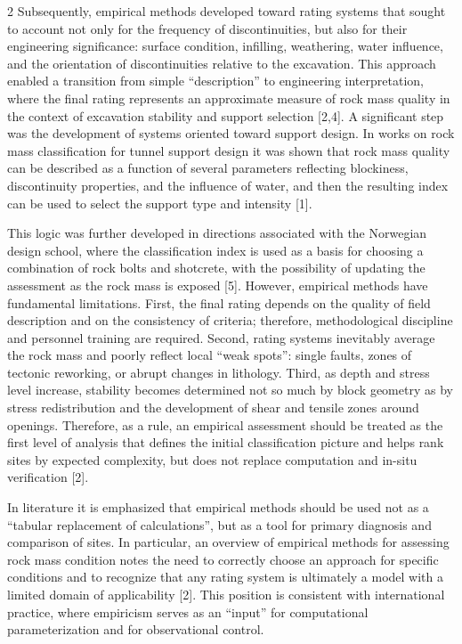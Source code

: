 \begin{multicols}{2}
Subsequently, empirical methods developed toward rating systems that
sought to account not only for the frequency of discontinuities, but
also for their engineering significance: surface condition, infilling,
weathering, water influence, and the orientation of discontinuities
relative to the excavation. This approach enabled a transition from
simple ``description'' to engineering interpretation, where the final
rating represents an approximate measure of rock mass quality in the
context of excavation stability and support selection {[}2,4{]}. A
significant step was the development of systems oriented toward support
design. In works on rock mass classification for tunnel support design
it was shown that rock mass quality can be described as a function of
several parameters reflecting blockiness, discontinuity properties, and
the influence of water, and then the resulting index can be used to
select the support type and intensity {[}1{]}.

This logic was further developed in directions associated with the
Norwegian design school, where the classification index is used as a
basis for choosing a combination of rock bolts and shotcrete, with the
possibility of updating the assessment as the rock mass is exposed
{[}5{]}. However, empirical methods have fundamental limitations. First,
the final rating depends on the quality of field description and on the
consistency of criteria; therefore, methodological discipline and
personnel training are required. Second, rating systems inevitably
average the rock mass and poorly reflect local ``weak spots'': single
faults, zones of tectonic reworking, or abrupt changes in lithology.
Third, as depth and stress level increase, stability becomes determined
not so much by block geometry as by stress redistribution and the
development of shear and tensile zones around openings. Therefore, as a
rule, an empirical assessment should be treated as the first level of
analysis that defines the initial classification picture and helps rank
sites by expected complexity, but does not replace computation and
in-situ verification {[}2{]}.

In literature it is emphasized that empirical methods should be used not
as a ``tabular replacement of calculations'', but as a tool for primary
diagnosis and comparison of sites. In particular, an overview of
empirical methods for assessing rock mass condition notes the need to
correctly choose an approach for specific conditions and to recognize
that any rating system is ultimately a model with a limited domain of
applicability {[}2{]}. This position is consistent with international
practice, where empiricism serves as an ``input'' for computational
parameterization and for observational control.


\end{multicols}
